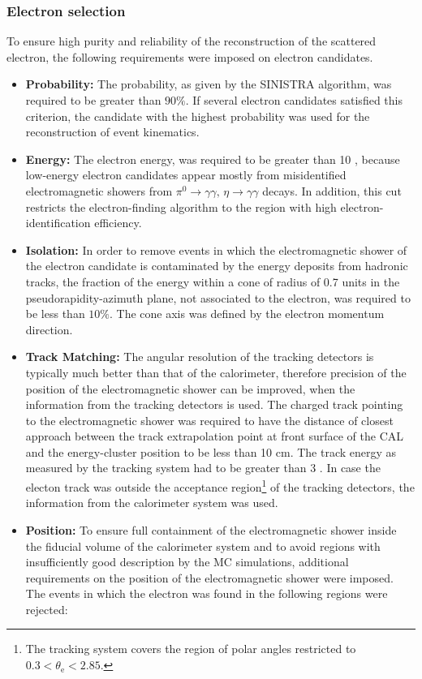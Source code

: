 \subsubsection{Electron selection}
\label{subsubsec:eleselect}

To ensure high purity and reliability of the reconstruction of the scattered electron, the following requirements were imposed on electron candidates.
\begin{itemize}
	\item \textbf{Probability:} The probability, as given by the SINISTRA algorithm, was required to be greater than $90\%$. If several electron candidates satisfied this criterion, the candidate with the highest probability was used for the reconstruction of event kinematics.
	\item \textbf{Energy:} The electron energy, \eefin was required to be greater than 10 \GeV, because low-energy electron candidates appear mostly from misidentified electromagnetic showers from $\pi^0\rightarrow\gamma\gamma,\, \eta\rightarrow\gamma\gamma$ decays. In addition, this cut restricts the electron-finding algorithm to the region with high electron-identification efficiency.
	\item \textbf{Isolation:} In order to remove events in which the electromagnetic shower of the electron candidate is contaminated by the energy deposits from hadronic tracks, the fraction of the energy within a cone of radius of 0.7 units in the pseudorapidity-azimuth plane, not associated to the electron, was required to be less than $10\%$. The cone axis was defined by the electron momentum direction.
	\item \textbf{Track Matching:} The angular resolution of the tracking detectors is typically much better than that of the calorimeter, therefore precision of the position of the electromagnetic shower can be improved, when the information from the tracking detectors is used. The charged track pointing to the electromagnetic shower was required to have the distance of closest approach between the track extrapolation point at front surface of the CAL and the energy-cluster position to be less than 10 cm. The track energy as measured by the tracking system had to be greater than 3 \GeV. In case the electon track was outside the acceptance region\footnote{The tracking system covers the region of polar angles restricted to $0.3 < \theta_\text{e} < 2.85$. } of the tracking detectors, the information from the calorimeter system was used.
	\item \textbf{Position:} To ensure full containment of the electromagnetic shower inside the fiducial volume of the calorimeter system and to avoid regions with insufficiently good description by the MC simulations, additional requirements on the position of the electromagnetic shower were imposed. The events in which the electron was found in the following regions were rejected:

\end{itemize}
